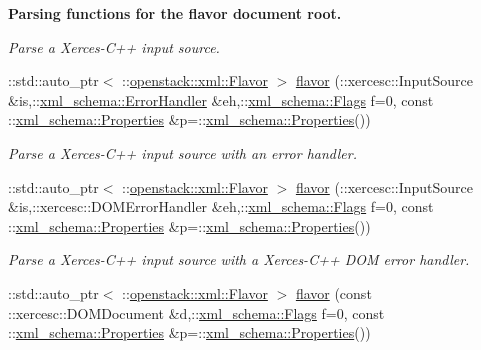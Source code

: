 \begin{Indent}{\bf Parsing functions for the flavor document root.}
\begin{DoxyCompactItemize}
\begin{DoxyCompactList}\small\item\em Parse a Xerces-\/C++ input source. \item\end{DoxyCompactList}\item 
::std::auto\_\-ptr$<$ ::\hyperlink{classopenstack_1_1xml_1_1Flavor}{openstack::xml::Flavor} $>$ \hyperlink{namespaceopenstack_1_1xml_a54d79dcbd88c0dc109fa8ae296d248bb}{flavor} (::xercesc::InputSource \&is,::\hyperlink{namespacexml__schema_ab1c9361bfd3b404eaabf0c31eded79dc}{xml\_\-schema::ErrorHandler} \&eh,::\hyperlink{namespacexml__schema_affb4c227cbd9aa7453dd1dc5a1401943}{xml\_\-schema::Flags} f=0, const ::\hyperlink{namespacexml__schema_ad27ce19a7ee1d3b1064092648898f64c}{xml\_\-schema::Properties} \&p=::\hyperlink{namespacexml__schema_ad27ce19a7ee1d3b1064092648898f64c}{xml\_\-schema::Properties}())
\begin{DoxyCompactList}\small\item\em Parse a Xerces-\/C++ input source with an error handler. \item\end{DoxyCompactList}\item 
::std::auto\_\-ptr$<$ ::\hyperlink{classopenstack_1_1xml_1_1Flavor}{openstack::xml::Flavor} $>$ \hyperlink{namespaceopenstack_1_1xml_a387218f5c0830d7632c02bd5a8f521ee}{flavor} (::xercesc::InputSource \&is,::xercesc::DOMErrorHandler \&eh,::\hyperlink{namespacexml__schema_affb4c227cbd9aa7453dd1dc5a1401943}{xml\_\-schema::Flags} f=0, const ::\hyperlink{namespacexml__schema_ad27ce19a7ee1d3b1064092648898f64c}{xml\_\-schema::Properties} \&p=::\hyperlink{namespacexml__schema_ad27ce19a7ee1d3b1064092648898f64c}{xml\_\-schema::Properties}())
\begin{DoxyCompactList}\small\item\em Parse a Xerces-\/C++ input source with a Xerces-\/C++ DOM error handler. \item\end{DoxyCompactList}\item 
::std::auto\_\-ptr$<$ ::\hyperlink{classopenstack_1_1xml_1_1Flavor}{openstack::xml::Flavor} $>$ \hyperlink{namespaceopenstack_1_1xml_aa4094e2882f2ffcfb172bc2fc65638aa}{flavor} (const ::xercesc::DOMDocument \&d,::\hyperlink{namespacexml__schema_affb4c227cbd9aa7453dd1dc5a1401943}{xml\_\-schema::Flags} f=0, const ::\hyperlink{namespacexml__schema_ad27ce19a7ee1d3b1064092648898f64c}{xml\_\-schema::Properties} \&p=::\hyperlink{namespacexml__schema_ad27ce19a7ee1d3b1064092648898f64c}{xml\_\-schema::Properties}())

\end{DoxyCompactItemize}
\end{Indent}
